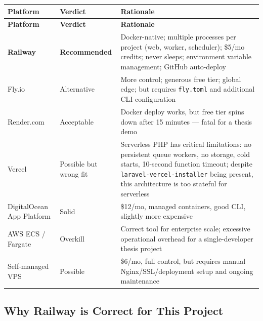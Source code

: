 \documentclass[12pt,a4paper]{report}
\begin{document}
\begin{longtable}{L{2.8cm} C{2cm} L{7.5cm}}
    \toprule
    \textbf{Platform} & \textbf{Verdict} & \textbf{Rationale} \\
    \midrule
    \endfirsthead
    \toprule
    \textbf{Platform} & \textbf{Verdict} & \textbf{Rationale} \\
    \midrule
    \endhead
    \bottomrule
    \endlastfoot

    \textbf{Railway} &
    \textcolor{successgreen}{\textbf{Recommended}} &
    Docker-native; multiple processes per project (web, worker,
    scheduler); \$5/mo credits; never sleeps; environment variable
    management; GitHub auto-deploy \\[6pt]

    Fly.io &
    \textcolor{accentblue}{Alternative} &
    More control; generous free tier; global edge; but requires
    \texttt{fly.toml} and additional CLI configuration \\[6pt]

    Render.com &
    \textcolor{warningorange}{Acceptable} &
    Docker deploy works, but free tier spins down after 15 minutes
    --- fatal for a thesis demo \\[6pt]

    Vercel &
    \textcolor{warningorange}{Possible but wrong fit} &
    Serverless PHP has critical limitations: no persistent queue
    workers, no storage, cold starts, 10-second function timeout;
    despite \texttt{laravel-vercel-installer} being present, this
    architecture is too stateful for serverless \\[6pt]

    DigitalOcean App Platform &
    \textcolor{accentblue}{Solid} &
    \$12/mo, managed containers, good CLI, slightly more expensive \\[6pt]

    AWS ECS / Fargate &
    \textcolor{dangerred}{Overkill} &
    Correct tool for enterprise scale; excessive operational overhead
    for a single-developer thesis project \\[6pt]

    Self-managed VPS &
    \textcolor{warningorange}{Possible} &
    \$6/mo, full control, but requires manual Nginx/SSL/deployment
    setup and ongoing maintenance \\

\end{longtable}

\subsection{Why Railway is Correct for This Project}
\end{document}
